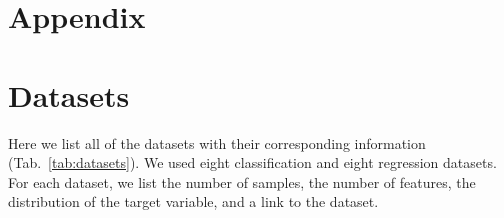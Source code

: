 \newpage
\section{Appendix}
\appendix

\label{appendix}

\section{Datasets}
\label{appendix:data}

Here we list all of the datasets with their corresponding information (Tab.~\ref{tab:datasets}). We used eight classification and eight regression datasets. For each dataset, we list the number of samples, the number of features, the distribution of the target variable, and a link to the dataset.

